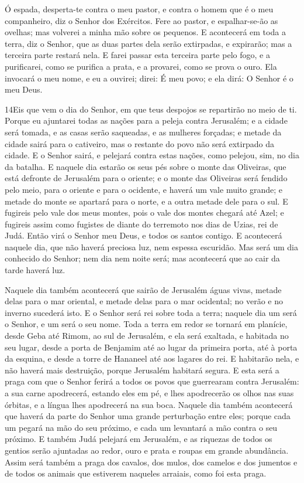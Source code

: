 Ó espada, desperta-te contra o meu pastor, e contra o homem que é
o meu companheiro, diz o Senhor dos Exércitos. Fere ao pastor, e
espalhar-se-ão as ovelhas; mas volverei a minha mão sobre os
pequenos. E acontecerá em toda a terra, diz o Senhor, que as
duas partes dela serão extirpadas, e expirarão; mas a terceira parte
restará nela. E farei passar esta terceira parte pelo fogo, e a
purificarei, como se purifica a prata, e a provarei, como se prova o
ouro. Ela invocará o meu nome, e eu a ouvirei; direi: É meu povo; e
ela dirá: O Senhor é o meu Deus.

\medskip

\lettrine{14} Eis que vem o dia do Senhor, em que teus
despojos se repartirão no meio de ti. Porque eu ajuntarei todas
as nações para a peleja contra Jerusalém; e a cidade será tomada, e
as casas serão saqueadas, e as mulheres forçadas; e metade da cidade
sairá para o cativeiro, mas o restante do povo não será extirpado da
cidade. E o Senhor sairá, e pelejará contra estas nações, como
pelejou, sim, no dia da batalha. E naquele dia estarão os seus
pés sobre o monte das Oliveiras, que está defronte de Jerusalém para
o oriente; e o monte das Oliveiras será fendido pelo meio, para o
oriente e para o ocidente, e haverá um vale muito grande; e metade
do monte se apartará para o norte, e a outra metade dele para o sul.
E fugireis pelo vale dos meus montes, pois o vale dos montes
chegará até Azel; e fugireis assim como fugistes de diante do
terremoto nos dias de Uzias, rei de Judá. Então virá o Senhor meu
Deus, e todos os santos contigo. E acontecerá naquele dia, que
não haverá preciosa luz, nem espessa escuridão. Mas será um dia
conhecido do Senhor; nem dia nem noite será; mas acontecerá que ao
cair da tarde haverá luz.

Naquele dia também acontecerá que sairão de Jerusalém águas vivas,
metade delas para o mar oriental, e metade delas para o mar
ocidental; no verão e no inverno sucederá isto. E o Senhor será
rei sobre toda a terra; naquele dia um será o Senhor, e um será o
seu nome. Toda a terra em redor se tornará em planície, desde
Geba até Rimom, ao sul de Jerusalém, e ela será exaltada, e habitada
no seu lugar, desde a porta de Benjamim até ao lugar da primeira
porta, até à porta da esquina, e desde a torre de Hananeel até aos
lagares do rei. E habitarão nela, e não haverá mais
destruição, porque Jerusalém habitará segura. E esta será a
praga com que o Senhor ferirá a todos os povos que guerrearam contra
Jerusalém: a sua carne apodrecerá, estando eles em pé, e lhes
apodrecerão os olhos nas suas órbitas, e a língua lhes apodrecerá na
sua boca. Naquele dia também acontecerá que haverá da parte
do Senhor uma grande perturbação entre eles; porque cada um pegará
na mão do seu próximo, e cada um levantará a mão contra o seu
próximo. E também Judá pelejará em Jerusalém, e as riquezas
de todos os gentios serão ajuntadas ao redor, ouro e prata e roupas
em grande abundância. Assim será também a praga dos cavalos,
dos mulos, dos camelos e dos jumentos e de todos os animais que
estiverem naqueles arraiais, como foi esta praga.

